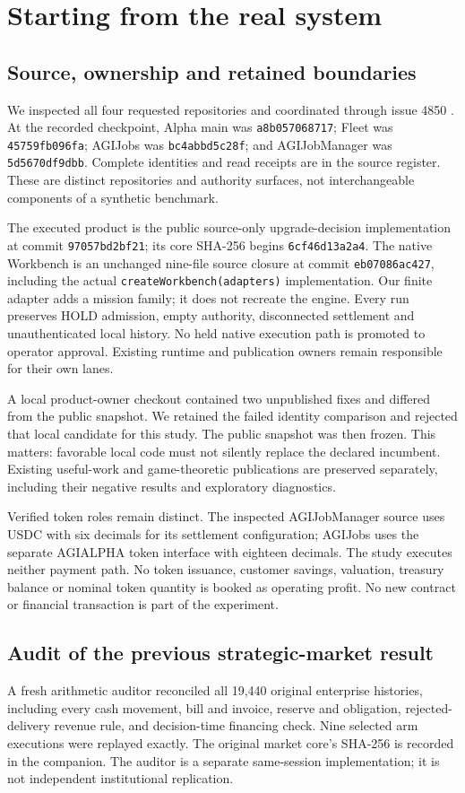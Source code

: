 \documentclass[11pt,a4paper]{article}
\begin{document}
\section{Starting from the real system}
\subsection{Source, ownership and retained boundaries}
We inspected all four requested repositories and coordinated through issue 4850 \cite{coordination}. At the recorded checkpoint, Alpha main was \texttt{a8b057068717}; Fleet was \texttt{45759fb096fa}; AGIJobs was \texttt{bc4abbd5c28f}; and AGIJobManager was \texttt{5d5670df9dbb}. Complete identities and read receipts are in the source register. These are distinct repositories and authority surfaces, not interchangeable components of a synthetic benchmark.

The executed product is the public source-only upgrade-decision implementation at commit \texttt{97057bd2bf21}; its core SHA-256 begins \texttt{6cf46d13a2a4}. The native Workbench is an unchanged nine-file source closure at commit \texttt{eb07086ac427}, including the actual \texttt{createWorkbench(adapters)} implementation. Our finite adapter adds a mission family; it does not recreate the engine. Every run preserves HOLD admission, empty authority, disconnected settlement and unauthenticated local history. No held native execution path is promoted to operator approval. Existing runtime and publication owners remain responsible for their own lanes.

A local product-owner checkout contained two unpublished fixes and differed from the public snapshot. We retained the failed identity comparison and rejected that local candidate for this study. The public snapshot was then frozen. This matters: favorable local code must not silently replace the declared incumbent. Existing useful-work and game-theoretic publications are preserved separately, including their negative results and exploratory diagnostics.

Verified token roles remain distinct. The inspected AGIJobManager source uses USDC with six decimals for its settlement configuration; AGIJobs uses the separate AGIALPHA token interface with eighteen decimals. The study executes neither payment path. No token issuance, customer savings, valuation, treasury balance or nominal token quantity is booked as operating profit. No new contract or financial transaction is part of the experiment.

\subsection{Audit of the previous strategic-market result}
A fresh arithmetic auditor reconciled all 19,440 original enterprise histories, including every cash movement, bill and invoice, reserve and obligation, rejected-delivery revenue rule, and decision-time financing check. Nine selected arm executions were replayed exactly. The original market core's SHA-256 is recorded in the companion. The auditor is a separate same-session implementation; it is not independent institutional replication.
\end{document}

